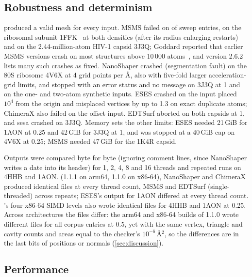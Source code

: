 \subsection{Robustness and determinism}
\label{sec:cmp-robustness}

\sesmesh{} produced a valid mesh for every input. MSMS failed on
 of  sweep entries, on the
ribosomal subunit 1FFK~\cite{pdb1ffk} at both densities (after its radius-enlarging
restarts) and on the 2.44-million-atom HIV-1 capsid 3J3Q; Goddard reported
that earlier MSMS versions crash on most structures above 10\,000
atoms~\cite{goddard2013}, and version 2.6.2 lists many such crashes as
fixed. NanoShaper crashed (segmentation fault) on the 80S ribosome 4V6X at
4 grid points per \AA{}, also with five-fold larger acceleration-grid limits,
and stopped with an error status and no message on 3J3Q at 1\Ang{} and on
the one- and two-atom synthetic inputs. ESES crashed on the input placed
$10^4$\Ang{} from the origin and misplaced vertices by up to 1.3\Ang{} on
exact duplicate atoms; ChimeraX also failed on the offset input. EDTSurf
aborted on both capsids at 1\Ang, and sesa crashed on 3J3Q. Memory sets the
other limits: ESES needed 21\,GiB for 1AON at 0.25\Ang{} and 42\,GiB for
3J3Q at 1\Ang, and was stopped at a 40\,GiB cap on 4V6X at 0.25\Ang; MSMS
needed 47\,GiB for the 1K4R capsid.

Outputs were compared byte for byte (ignoring comment lines, since
NanoShaper writes a date into its header) for 1, 2, 4, 8 and 16 threads and
repeated runs on 4HHB and 1AON. \sesmesh{} (1.1.1 on arm64, 1.1.0 on
x86-64), NanoShaper and ChimeraX produced identical files at every thread
count, MSMS and EDTSurf (single-threaded) across repeats; ESES's output for
1AON differed at every thread count. \sesmesh's four x86-64 SIMD levels also
wrote identical files for 4HHB and 1AON at 0.25\Ang. Across architectures
the files differ: the arm64 and x86-64 builds of 1.1.0 wrote different
files for all  corpus entries at 0.5\Ang, yet with the same
vertex, triangle and cavity counts and areas equal to the checker's
$10^{-6}$\,\AA$^2$, so the differences are in the last bits of positions
or normals (\cref{sec:discussion}).

\subsection{Performance}
\label{sec:cmp-performance}


